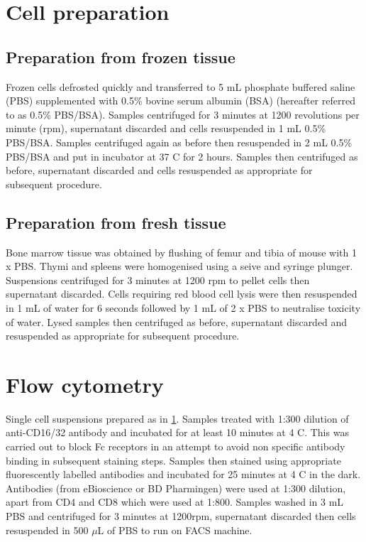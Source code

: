 \section{Cell preparation}
\label{sec:cellprep}

\subsection{Preparation from frozen tissue}

Frozen cells defrosted quickly and transferred to 5 mL phosphate buffered saline (PBS) supplemented with 0.5\% bovine serum albumin (BSA) (hereafter referred to as 0.5\% PBS/BSA).
Samples centrifuged for 3 minutes at 1200 revolutions per minute (rpm), supernatant discarded and cells resuspended in 1 mL 0.5\% PBS/BSA.
Samples centrifuged again as before then resuspended in 2 mL 0.5\% PBS/BSA and put in incubator at 37 \textdegree C for 2 hours.
Samples then centrifuged as before, supernatant discarded and cells resuspended as appropriate for subsequent procedure.

\subsection{Preparation from fresh tissue}
Bone marrow tissue was obtained by flushing of femur and tibia of mouse with 1 x PBS.
Thymi and spleens were homogenised using a seive and syringe plunger.
Suspensions centrifuged for 3 minutes at 1200 rpm to pellet cells then supernatant discarded.
Cells requiring red blood cell lysis were then resuspended in 1 mL of water for 6 seconds followed by 1 mL of 2 x PBS to neutralise toxicity of water.
Lysed samples then centrifuged as before, supernatant discarded and resuspended as appropriate for subsequent procedure.

\section{Flow cytometry}

Single cell suspensions prepared as in \cref{sec:cellprep}.
Samples treated with 1:300 dilution of anti-CD16/32 antibody and incubated for at least 10 minutes at 4 \textdegree C.
This was carried out to block Fc receptors in an attempt to avoid non specific antibody binding in subsequent staining steps.
Samples then stained using appropriate fluorescently labelled antibodies and incubated for 25 minutes at 4 \textdegree C in the dark.
Antibodies (from eBioscience or BD Pharmingen) were used at 1:300 dilution, apart from CD4 and CD8 which were used at 1:800. 
Samples washed in 3 mL PBS and centrifuged for 3 minutes at 1200rpm, supernatant discarded then cells resuspended in 500 $\mu$L of PBS to run on FACS machine.

